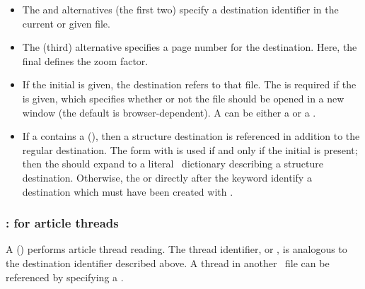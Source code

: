 \documentclass{pdftexmanual}
\begin{document}
\begin{itemize}
\item The  and  alternatives (the
first two) specify a destination identifier in the current or given
file.

\item The  (third) alternative specifies a page
number for the destination. Here, the final 
defines the zoom factor.

\item If the initial  is given, the destination
refers to that file. The  is required if the
 is given, which specifies whether or not the
file should be opened in a new window (the default is
browser-dependent). A  can be either a
\type{(}\type{)} or a
\type{<<}\type{>>}.

\item If a  contains a
 (), then a structure
destination is referenced in addition to the regular destination. The
form with  is used if and only if the initial
 is present; then the 
should expand to a literal \PDF\ dictionary describing a structure
destination. Otherwise, the  or 
directly after the  keyword identify a destination which
must have been created with  \unskip.

\end{itemize}

\subsubsection{: 
                for article threads}

\noindent{}

A  () performs article
thread reading. The thread identifier,  or
, is analogous to the destination identifier described
above. A thread in another \PDF\ file can be referenced by specifying a
.
\end{document}
